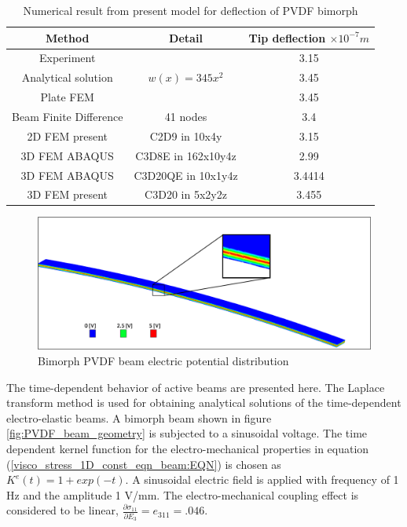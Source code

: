 \begin{table}
\raggedright
\caption{Numerical result from present model for deflection of PVDF bimorph}
\begin{tabular}{ccc} \hline
Method  & Detail &  Tip deflection $\times 10^{-7} m$ \\ \hline
Experiment \cite{tzou1991distributed} &  & 3.15 \\ 
Analytical solution & $w(x)=345 x^2$ & 3.45\\ 
Plate FEM \cite{franco2000modelling} &  & 3.45 \\ 
Beam Finite Difference & 41 nodes & 3.4 \\  
2D FEM present & C2D9 in 10x4y &3.15 \\  
3D FEM ABAQUS & C3D8E in 162x10y4z & 2.99\\ 
3D FEM ABAQUS & C3D20QE in 10x1y4z & 3.4414\\ 
3D FEM present & C3D20 in 5x2y2z & 3.455 \\ \hline
\end{tabular}
\label{table:PVDF_bimorph_numerical_result_static} 
\end{table}

\begin{figure}
\centering
\includegraphics[width=6.0in]{./chap_4_structural_analyses/pdf_beam/PVDF_beam_geometry_epot_distribution.png}
\caption{Bimorph PVDF beam electric potential distribution}
\label{fig:PVDF_beam_geometry_epot_distribution}
\end{figure}


The time-dependent behavior of active beams are presented here.  
The Laplace transform method is used for obtaining analytical solutions of the time-dependent electro-elastic beams.
A bimorph beam shown in figure \ref{fig:PVDF_beam_geometry} is subjected to a sinusoidal voltage.
The time dependent kernel function for the electro-mechanical properties in equation (\ref{visco_stress_1D_const_eqn_beam:EQN}) is chosen as $K^e (t)=1+exp(-t)$.
A sinusoidal electric field is applied with frequency of 1 Hz and the amplitude 1 V/mm.
The electro-mechanical coupling effect is considered to be linear, $\frac{\partial \sigma_{11}}{\partial E_{3}}=e_{311}=.046$.

